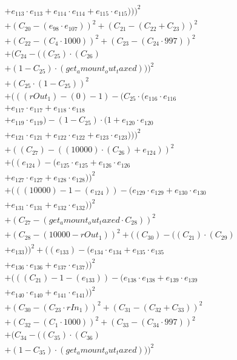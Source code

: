 \documentclass[10pt, a4paper]{article}
\begin{document}
\begin{align*}
& + e_{113} \cdot e_{113} + e_{114} \cdot e_{114} + e_{115} \cdot e_{115})))^{2} \\
& + (C_{20} - (e_{98} \cdot e_{107}))^{2} + (C_{21} - (C_{22} + C_{23}))^{2} \\
& + (C_{22} - (C_{4}  \cdot  1000))^{2} + (C_{23} - (C_{24}  \cdot  997))^{2} \\
& + (C_{24} - ((C_{25})  \cdot  (C_{26}) \\
& + (1 - C_{25})  \cdot  (get_amount_out_taxed)))^{2} \\
& + (C_{25} \cdot (1 - C_{25}))^{2} \\
& + (((rOut_1) - (0) - 1) - (C_{25} \cdot (e_{116} \cdot e_{116} \\
& + e_{117} \cdot e_{117} + e_{118} \cdot e_{118} \\
& + e_{119} \cdot e_{119}) - (1 - C_{25}) \cdot (1 + e_{120} \cdot e_{120} \\
& + e_{121} \cdot e_{121} + e_{122} \cdot e_{122} + e_{123} \cdot e_{123})))^{2} \\
& + ((C_{27}) - ((10000)  \cdot  (C_{26}) + e_{124}))^{2} \\
& + ((e_{124}) - (e_{125} \cdot e_{125} + e_{126} \cdot e_{126} \\
& + e_{127} \cdot e_{127} + e_{128} \cdot e_{128}))^{2} \\
& + (((10000) - 1 - (e_{124})) - (e_{129} \cdot e_{129} + e_{130} \cdot e_{130} \\
& + e_{131} \cdot e_{131} + e_{132} \cdot e_{132}))^{2} \\
& + (C_{27} - (get_amount_out_taxed  \cdot  C_{28}))^{2} \\
& + (C_{28} - (10000 - rOut_1))^{2} + ((C_{30}) - ((C_{21})  \cdot  (C_{29}) \\
& + e_{133}))^{2} + ((e_{133}) - (e_{134} \cdot e_{134} + e_{135} \cdot e_{135} \\
& + e_{136} \cdot e_{136} + e_{137} \cdot e_{137}))^{2} \\
& + (((C_{21}) - 1 - (e_{133})) - (e_{138} \cdot e_{138} + e_{139} \cdot e_{139} \\
& + e_{140} \cdot e_{140} + e_{141} \cdot e_{141}))^{2} \\
& + (C_{30} - (C_{23}  \cdot  rIn_1))^{2} + (C_{31} - (C_{32} + C_{33}))^{2} \\
& + (C_{32} - (C_{1}  \cdot  1000))^{2} + (C_{33} - (C_{34}  \cdot  997))^{2} \\
& + (C_{34} - ((C_{35})  \cdot  (C_{36}) \\
& + (1 - C_{35})  \cdot  (get_amount_out_taxed)))^{2} \\

\end{align*}
\end{document}
